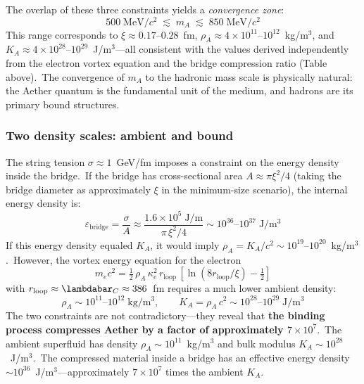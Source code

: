 ﻿\documentclass[12pt,letterpaper]{article}
\newcommand{\rhoa}{\rho_{\!A}}
\newcommand{\Ka}{K_{\!A}}
\begin{document}
%
The overlap of these three constraints yields a \emph{convergence zone}:
%
\begin{equation}
  500\;\mathrm{MeV}/c^2 \;\lesssim\; m_A \;\lesssim\; 850\;\mathrm{MeV}/c^2
  \label{eq:mA-range}
\end{equation}
%
This range corresponds to $\xi \approx 0.17$--$0.28$~fm,
$\rhoa \approx 4 \times 10^{11}$--$10^{12}$~kg/m$^3$, and
$\Ka \approx 4 \times 10^{28}$--$10^{29}$~J/m$^3$---all consistent with the
values derived independently from the electron vortex equation and the bridge
compression ratio (Table above).\ The convergence of $m_A$ to the hadronic
mass scale is physically natural: the Aether quantum is the fundamental unit
of the medium, and hadrons are its primary bound structures.


\subsubsection*{Two density scales: ambient and bound}

The string tension $\sigma \approx 1$~GeV/fm imposes a constraint on the energy
density inside the bridge.\ If the bridge has cross-sectional area
$A \approx \pi\xi^2/4$ (taking the bridge diameter as approximately $\xi$ in the minimum-size scenario), the internal energy density is:
%
\begin{equation}
  \varepsilon_{\mathrm{bridge}} = \frac{\sigma}{A}
    \approx \frac{1.6 \times 10^5\;\mathrm{J/m}}{\pi\,\xi^2/4}
    \sim 10^{36}\text{--}10^{37}\;\mathrm{J/m^3}
  \label{eq:bridge-energy-density}
\end{equation}
%
If this energy density equaled $\Ka$, it would imply
$\rhoa = \Ka/c^2 \sim 10^{19}\text{--}10^{20}$~kg/m$^3$.\ However, the
vortex energy equation for the electron
%
\begin{equation}
  m_e c^2 = \tfrac{1}{2}\,\rhoa\,\kappa_e^2\,r_{\mathrm{loop}}\,
    [\ln(8r_{\mathrm{loop}}/\xi) - \tfrac{1}{2}]
\end{equation}
%
with $r_{\mathrm{loop}} \approx \lambdabar_C \approx 386$~fm requires a much
lower ambient density:
%
\begin{equation}
  \rhoa \sim 10^{11}\text{--}10^{12}\;\mathrm{kg/m^3}, \qquad
  \Ka = \rhoa\,c^2 \sim 10^{28}\text{--}10^{29}\;\mathrm{J/m^3}
  \label{eq:ambient-density}
\end{equation}
%
The two constraints are not contradictory---they reveal that \textbf{the binding
process compresses Aether by a factor of approximately $7 \times 10^7$}.\ The ambient
superfluid has density $\rhoa \sim 10^{11}$~kg/m$^3$ and bulk modulus
$\Ka \sim 10^{28}$~J/m$^3$.\ The compressed material inside a bridge has an effective
energy density $\sim 10^{36}$~J/m$^3$---approximately $7 \times 10^7$ times the ambient
$\Ka$.
\end{document}
